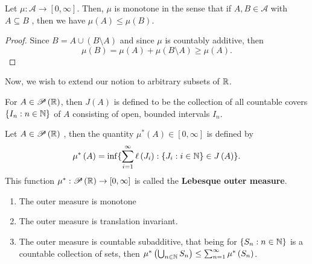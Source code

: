 \begin{proposition}
	Let \(\mu: \mathscr{A} \to \left[ 0, \infty \right]  \). Then, \( \mu\) is monotone in the sense that if \(A, B \in \mathscr{A}\) with \(A \subseteq B\) , then we have \( \mu\left( A \right)  \le \mu\left( B \right) \).
\end{proposition}
\begin{proof}
	Since \(B = A \cup \left( B \setminus A \right) \)	 and since \( \mu\) is countably additive, then \[
		\mu\left( B \right)  = \mu\left( A \right)  + \mu\left( B \setminus A \right) \ge \mu\left( A \right)
	.\]
\end{proof}
Now, we wish to extend our notion to arbitrary subsets of \(\mathbb{R}\).
\begin{notation}
	For \(A \in \mathscr{P}\left( \mathbb{R} \right) \), then \(J\left( A \right) \) is defined to be the collection of all countable covers \(\{I_{n} : n \in \mathbb{N}\} \) of \(A\) consisting of open, bounded intervals \(I_{n}\).
\end{notation}
\begin{definition}
	Let \(A \in \mathscr{P}\left( \mathbb{R} \right) \)	, then the quantity \( \mu^{*} \left( A \right)  \in \left[ 0, \infty \right] \) is defined by \[
		\mu^{*}\left( A \right) = \inf \{\sum_{i= 1}^{\infty} \ell\left( J_{i} \right) : \{J_{i} : i \in \mathbb{N}\} \in J\left( A \right)  \}
	.\]
	This function \( \mu^{*}: \mathscr{P}\left( \mathbb{R} \right)  \to \left[ 0, \infty \right] \) is called the \textbf{Lebesque outer measure}.
\end{definition}
\begin{lemma}
	\begin{enumerate}
		\item The outer measure is monotone
		\item The outer measure is translation invariant.
		\item The outer measure is countable subadditive, that being for \(\{S_{n} : n \in \mathbb{N}\} \) is a countable collection of sets, then \( \mu^{*}\left( \bigcup_{n \in \mathbb{N}} S_{n} \right) \le \sum_{n= 1}^{\infty} \mu^{*}\left( S_{n} \right) \).  \end{enumerate}
\end{lemma}

